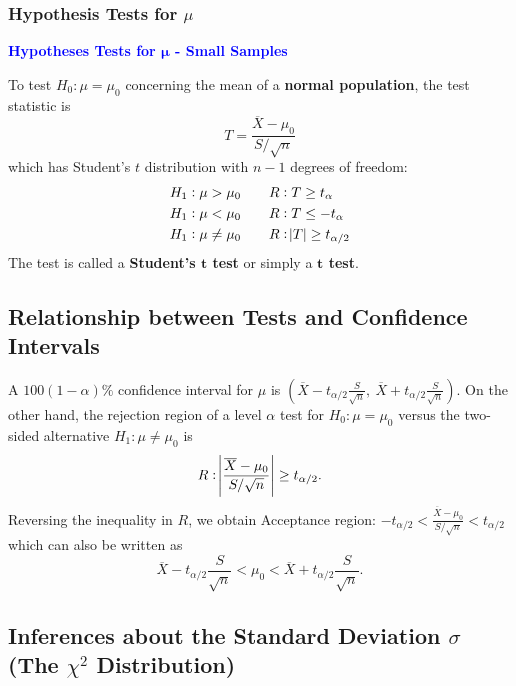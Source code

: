 \documentclass[12pt,a4paper]{article}
\newcommand{\dispsty}{\displaystyle}
\begin{document}
\subsubsection{Hypothesis Tests for $\mu$}
\begin{tcolorbox}[colback=white]\begin{center}
		\textcolor{blue}{\bf Hypotheses Tests for $\boldsymbol{\mu}$ - Small Samples}
	\end{center}
	To test $H_0:\mu=\mu_0$ concerning the mean of a \textbf{normal population}, the test statistic is \[
	T=\frac{\overline{X}-\mu_0}{S/\sqrt{n}}
	\] which has Student's $t$ distribution with $n-1$ degrees of freedom: \begin{align*}
	H_1:\mu>\mu_0\qquad & R:T\geq t_\alpha \\
	H_1:\mu<\mu_0\qquad & R:T\leq -t_\alpha \\
	H_1:\mu\neq\mu_0\qquad & R:\abs{T}\geq t_{\alpha/2}
	\end{align*} The test is called a \textbf{Student's $\boldsymbol{t}$ test} or simply a \textbf{$\boldsymbol{t}$ test}.
\end{tcolorbox}

\subsection{Relationship between Tests and Confidence Intervals}

A $100(1-\alpha)\%$ confidence interval for $\mu$ is $\dispsty
\left(\overline{X}-t_{\alpha/2}\frac{S}{\sqrt{n}},\ \overline{X}+t_{\alpha/2}\frac{S}{\sqrt{n}}\right).
$ On the other hand, the rejection region of a level $\alpha$ test for $H_0:\mu=\mu_0$ versus the two-sided alternative $H_1:\mu\neq\mu_0$ is \[
R:\abs{\frac{\overline{X}-\mu_0}{S/\sqrt{n}}}\geq t_{\alpha/2}.
\] Reversing the inequality in $R$, we obtain Acceptance region: $\dispsty
-t_{\alpha/2}<\frac{\overline{X}-\mu_0}{S/\sqrt{n}}<t_{\alpha/2}
$ which can also be written as \[
\overline{X}-t_{\alpha/2}\frac{S}{\sqrt{n}}<\mu_0<\overline{X}+t_{\alpha/2}\frac{S}{\sqrt{n}}.
\]
\subsection{Inferences about the Standard Deviation $\sigma$ (The $\chi^2$ Distribution)}
\end{document}
